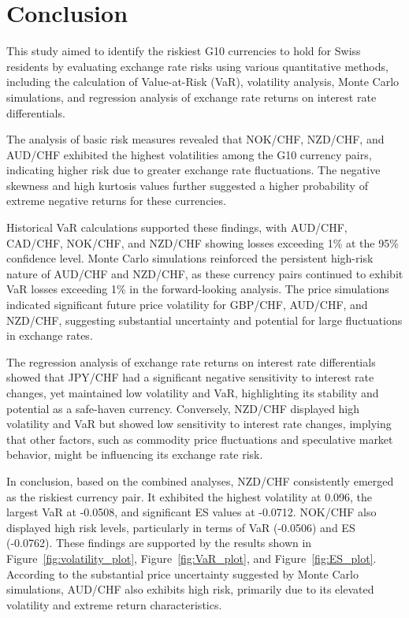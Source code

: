\documentclass{article}
\begin{document}
\section{Conclusion}

This study aimed to identify the riskiest G10 currencies to hold for Swiss residents by evaluating exchange rate risks using various quantitative methods, including the calculation of Value-at-Risk (VaR), volatility analysis, Monte Carlo simulations, and regression analysis of exchange rate returns on interest rate differentials.

The analysis of basic risk measures revealed that NOK/CHF, NZD/CHF, and AUD/CHF exhibited the highest volatilities among the G10 currency pairs, indicating higher risk due to greater exchange rate fluctuations. The negative skewness and high kurtosis values further suggested a higher probability of extreme negative returns for these currencies.

Historical VaR calculations supported these findings, with AUD/CHF, CAD/CHF, NOK/CHF, and NZD/CHF showing losses exceeding 1\% at the 95\% confidence level. Monte Carlo simulations reinforced the persistent high-risk nature of AUD/CHF and NZD/CHF, as these currency pairs continued to exhibit VaR losses exceeding 1\% in the forward-looking analysis. The price simulations indicated significant future price volatility for GBP/CHF, AUD/CHF, and NZD/CHF, suggesting substantial uncertainty and potential for large fluctuations in exchange rates.

The regression analysis of exchange rate returns on interest rate differentials showed that JPY/CHF had a significant negative sensitivity to interest rate changes, yet maintained low volatility and VaR, highlighting its stability and potential as a safe-haven currency. Conversely, NZD/CHF displayed high volatility and VaR but showed low sensitivity to interest rate changes, implying that other factors, such as commodity price fluctuations and speculative market behavior, might be influencing its exchange rate risk.

In conclusion, based on the combined analyses, NZD/CHF consistently emerged as the riskiest currency pair. It exhibited the highest volatility at 0.096, the largest VaR at -0.0508, and significant ES values at -0.0712. NOK/CHF also displayed high risk levels, particularly in terms of VaR (-0.0506) and ES (-0.0762). These findings are supported by the results shown in Figure~\ref{fig:volatility_plot}, Figure~\ref{fig:VaR_plot}, and Figure~\ref{fig:ES_plot}. According to the substantial price uncertainty suggested by Monte Carlo simulations, AUD/CHF also exhibits high risk, primarily due to its elevated volatility and extreme return characteristics.
\end{document}

